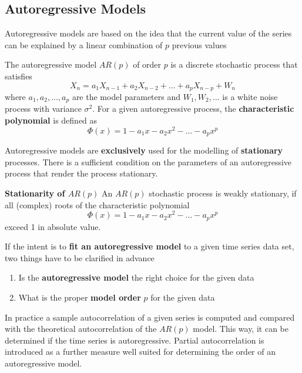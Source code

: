 \documentclass[11pt]{article}
\begin{document}
\subsection{Autoregressive Models}
Autoregressive models are based on the idea that the current value of the series can be explained by a linear combination of $p$ previous values
\begin{definition}
	The autoregressive model $AR(p)$ of order $p$ is a discrete stochastic process that satisfies
	\begin{equation*}
		X_n = a_1 X_{n-1} + a_2 X_{n-2} + \dots + a_p X_{n-p} + W_n
	\end{equation*}
	where $a_1,a_2,\dots,a_p$ are the model parameters and $W_1, W_2, \dots$ is a white noise process with variance $\sigma^2$. For a given autoregressive process, the \textbf{characteristic polynomial} is defined as
	\begin{equation*}
		\Phi(x) = 1 - a_1 x - a_2 x^2 - \dots - a_p x^p
	\end{equation*}
\end{definition}

Autoregressive models are \textbf{exclusively} used for the modelling of \textbf{stationary} processes. There is a sufficient  condition on the parameters of an autoregressive process that render the process stationary.
\begin{definition}
	\textbf{Stationarity of $AR(p)$}
	An $AR(p)$ stochastic process is weakly stationary, if all (complex) roots of the characteristic polynomial
	\begin{equation*}
		\Phi(x) = 1 - a_1 x - a_2 x^2 - \dots - a_p x^p
	\end{equation*}
	exceed 1 in absolute value.
\end{definition}
If the intent is to \textbf{fit an autoregressive model} to a given time series data set, two things have to be clarified in advance
\begin{enumerate}
	\item Is the \textbf{autoregressive model} the right choice for the given data
	\item What is the proper \textbf{model order} $p$ for the given data
\end{enumerate}
In practice a sample autocorrelation of a given series is computed and compared with the theoretical autocorrelation of the $AR(p)$ model. This way, it can be determined if the time series is autoregressive. Partial autocorrelation is introduced as a further measure well suited for determining the order of an autoregressive model.
\end{document}
